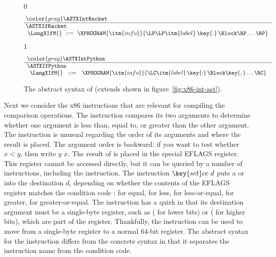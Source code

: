 \documentclass[7x10]{TimesAPriori_MIT}%
\newcommand{\gray}[1]{{\color{gray} #1}}
\def\racketEd{0}
\def\pythonEd{1}
\providecommand{\BookEdition}{1}
\let\edition\BookEdition
\newcommand{\pythonColor}[0]{}
\numberwithin{theorem}{chapter}
\numberwithin{definition}{chapter}
\numberwithin{equation}{chapter}
\begin{document}
\begin{figure}[tp]
\begin{tcolorbox}[colback=white]
\small    
{\if\edition\racketEd    
\[\arraycolsep=3pt
\begin{array}{l}
  \gray{\ASTXIntRacket} \\ \hline
  \ASTXIfRacket \\
\begin{array}{lcl}
\LangXIfM{} &::= & \XPROGRAM{\itm{info}}{\LP\LP\itm{label} \,\key{.}\, \Block \RP\ldots\RP}
\end{array}
\end{array}
\]
\fi}
%
{\if\edition\pythonEd\pythonColor
\[
\begin{array}{l}
  \gray{\ASTXIntPython} \\ \hline
  \ASTXIfPython \\
\begin{array}{lcl}
\LangXIfM{} &::= & \XPROGRAM{\itm{info}}{\LC\itm{label} \,\key{:}\, \Block \key{,} \ldots \RC }
\end{array}
\end{array}
\]
\fi}
\end{tcolorbox}
\caption{The abstract syntax of \LangXIf{} (extends \LangXInt{} shown in figure~\ref{fig:x86-int-ast}).}
\label{fig:x86-1}
\end{figure}

Next we consider the x86 instructions that are relevant for compiling
the comparison operations. The  instruction compares its two
arguments to determine whether one argument is less than, equal to, or
greater than the other argument. The  instruction is unusual
regarding the order of its arguments and where the result is
placed. The argument order is backward: if you want to test whether
$x < y$, then write  $y$\code{,} $x$. The result of
 is placed in the special EFLAGS register. This register
cannot be accessed directly, but it can be queried by a number of
instructions, including the  instruction. The instruction
$\key{set}cc~d$ puts a  or  into the destination $d$,
depending on whether the contents of the EFLAGS register matches the
condition code :  for equal,  for less, 
for less-or-equal,  for greater,  for greater-or-equal.
The  instruction has a quirk in that its destination argument
must be a single-byte register, such as  ( for lower bits) or
 ( for higher bits), which are part of the 
register.  Thankfully, the  instruction can be used to
move from a single-byte register to a normal 64-bit register.  The
abstract syntax for the  instruction differs from the
concrete syntax in that it separates the instruction name from the
condition code.
\end{document}
